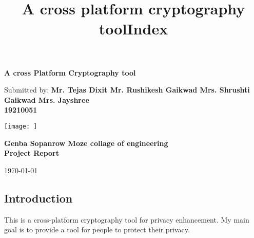 \documentclass[12pt]{article}
\begin{document}
\begin{titlepage}


\setlength{\droptitle}{-4em} 
\center

{\huge \bfseries A cross Platform Cryptography tool } %
\\[2cm] 


\begin{minipage}{0.4\textwidth}
\begin{center} \large
Submitted by: \textbf{Mr. Tejas Dixit 
                    Mr. Rushikesh Gaikwad 
                       Mrs. Shrushti Gaikwad 
                       Mrs. Jayshree } %
\\[0.5cm]
\textbf{19210051} %
\end{center}
\end{minipage} 

\vspace{10em}

\texttt{[image: ]}

\vspace{10em}
\begin{minipage}{0.6\textwidth}
\begin{center} \large
\textbf{Genba Sopanrow Moze collage of engineering} %
\\[0.5cm]
\textbf{Project Report} %
\end{center}
\end{minipage} 

\vspace{5em}
{\large \today}


\end{titlepage}



\newpage
\begin{center}
\title*{\LARGE \textbf{A cross platform cryptography tool}}       
\end{center}


\newpage
\begin{center}
\title*{\LARGE \textbf{Index}}


\end{center}

\begin{flushleft}
\section*{\large {Introduction}}
This is a cross-platform cryptography tool for privacy enhancement.
My main goal is to provide a tool for people to protect their privacy.


\end{flushleft}
\end{document}
